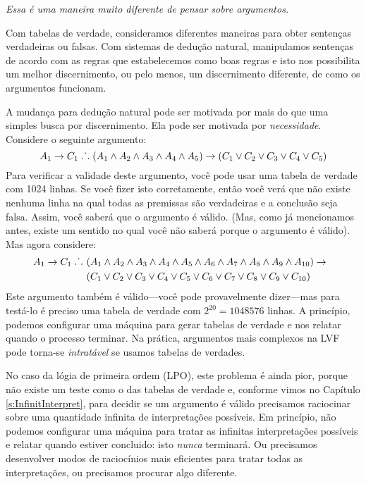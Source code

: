 \emph{Essa \'e uma maneira muito diferente de pensar sobre argumentos.} 

Com tabelas de verdade,  consideramos diferentes maneiras  para obter senten\c cas verdadeiras ou falsas. Com sistemas de dedu\c c\~ao natural, manipulamos  senten\c cas de acordo com as regras que estabelecemos como boas regras e isto nos possibilita um melhor discernimento, ou pelo menos, um discernimento diferente,  de como os argumentos funcionam. 

A mudan\c ca para dedu\c c\~ao natural pode ser motivada por mais do que uma simples busca por discernimento. Ela pode ser motivada por  \emph{necessidade}. Considere o seguinte argumento:
$$A_1 \rightarrow C_1 \mathrel{\ldotp\dot{}\,\ldotp} (A_1 \wedge A_2 \wedge A_3 \wedge A_4 \wedge A_5) \rightarrow (C_1 \vee C_2 \vee C_3 \vee C_4 \vee C_5)$$
Para verificar a validade deste argumento, voc\^e   pode usar uma tabela de verdade com 1024 linhas. Se voc\^e fizer isto corretamente, ent\~ao voc\^e ver\'a que  n\~ao existe nenhuma linha na qual todas as premissas s\~ao verdadeiras e a conclus\~ao seja falsa.  Assim, voc\^e saber\'a que o argumento \'e v\'alido.  (Mas,  como  j\'a mencionamos antes, existe um sentido no qual voc\^e n\~ao saber\'a porque o argumento \'e v\'alido). Mas agora considere: 
\begin{align*}
A_1 \rightarrow C_1 \mathrel{\ldotp\dot{}\,\ldotp}\ & (A_1 \wedge A_2 \wedge A_3 \wedge A_4 \wedge A_5 \wedge A_6 \wedge A_7 \wedge A_8 \wedge A_9 \wedge A_{10}) \rightarrow \phantom{(}\\
&(C_1 \vee C_2 \vee C_3 \vee C_4 \vee C_5 \vee C_6 \vee C_7 \vee C_8 \vee C_9 \vee C_{10})
\end{align*}
Este argumento tamb\'em \'e v\'alido---voc\^e pode provavelmente dizer---mas para test\'a-lo \'e preciso uma tabela de verdade com
 $2^{20} = 1048576$ linhas.  A princ\'ipio, podemos configurar uma m\'aquina para gerar tabelas de verdade e nos relatar quando o processo terminar. Na pr\'atica, argumentos mais complexos na LVF pode torna-se \emph{intrat\'avel} se usamos tabelas de verdades. 
 
  
No caso da lógia de primeira ordem (LPO), este problema é ainda pior, porque não existe um teste como o das tabelas de verdade e, conforme vimos no Capítulo \ref{s:InfinitInterpret}, para decidir se um argumento é válido precisamos raciocinar sobre uma quantidade infinita de interpretações possíveis.
Em princ\'ipio, n\~ao podemos configurar uma m\'aquina para tratar as infinitas interpreta\c c\~oes poss\'iveis e relatar quando estiver  concluido:  isto  \emph{nunca}  terminar\'a. Ou precisamos desenvolver modos de racioc\'inios mais eficientes para tratar todas as interpreta\c c\~oes, ou precisamos procurar algo diferente. 

